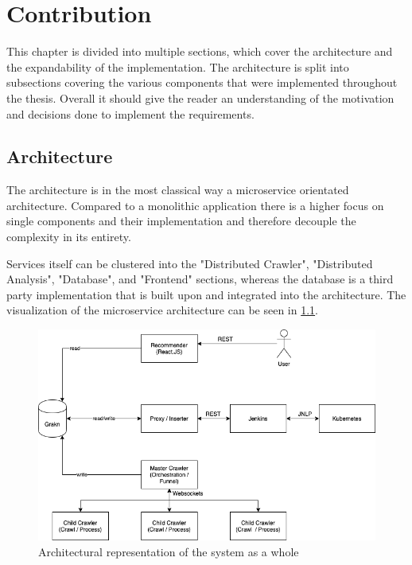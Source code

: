 \chapter{Contribution}

This chapter is divided into multiple sections, which cover the architecture and the expandability of the implementation. The architecture is split into subsections covering the various components that were implemented throughout the thesis. Overall it should give the reader an understanding of the motivation and decisions done to implement the requirements.


\section{Architecture}

The architecture is in the most classical way a microservice orientated architecture. Compared to a monolithic application there is a higher focus on single components and their implementation and therefore decouple the complexity in its entirety.

Services itself can be clustered into the "Distributed Crawler", "Distributed Analysis", "Database", and "Frontend" sections, whereas the database is a third party implementation that is built upon and integrated into the architecture. The visualization of the microservice architecture can be seen in \ref{fig:architecture}.

\begin{figure}[H]
    \centering
    \includegraphics[scale=0.5]{graphics/architecture_v2.png}
    \caption{Architectural representation of the system as a whole}
    \label{fig:architecture}
\end{figure}

